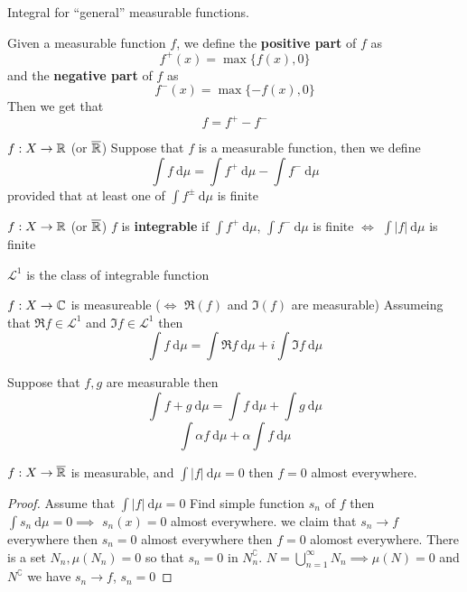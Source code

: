 Integral for ``general'' measurable functions.

\begin{definition}
  Given a measurable function $f$, we define the \textbf{positive part} of $f$ as 
  \[f^+(x) = \max\{f(x), 0\}\]
  and the \textbf{negative part} of $f$ as
  \[f^-(x) = \max\{-f(x), 0\}\]
  Then we get that 
  \[f = f^+ - f^-\]
\end{definition}

\begin{definition}
  $f: X \to \mathbb R$ (or $\overline{\mathbb R}$)
  Suppose that $f$ is a measurable function, then we define
  \[\int f \ \mathrm{d}\mu = \int f^+\ \mathrm{d}\mu - \int f^-\ \mathrm{d}\mu\]
  provided that at least one of $\int f^\pm \ \mathrm{d}\mu$ is finite
\end{definition}
\begin{definition}
  $f: X \to \mathbb R$ (or $\overline{\mathbb R}$)
  $f$ is \textbf{integrable} if $\int f^+ \ \mathrm{d}\mu$, $\int f^- \ \mathrm{d}\mu$ is finite
  $\iff$ $\int |f| \ \mathrm{d}\mu$ is finite

  $\mathcal{L}^1$ is the class of integrable function
\end{definition}

\begin{definition}
$f: X \to \mathbb C$ is measureable ($\iff$ $\Re(f)$ and $\Im(f)$ are measurable)
Assumeing that $\Re f \in \mathcal{L}^1$ and $\Im f \in \mathcal{L}^1$ then
\[\int f\ \mathrm{d}\mu = \int \Re f \ \mathrm{d}\mu + i \int \Im f \ \mathrm{d}\mu\]
\end{definition}

\begin{claim}
  Suppose that $f, g$ are measurable then
  \[\int f + g\ \mathrm{d}\mu  = \int f\ \mathrm{d}\mu + \int g\ \mathrm{d}\mu\]
  \[\int \alpha f \ \mathrm{d}\mu + \alpha \int f \ \mathrm{d}\mu\]
\end{claim}

\begin{lemma}
  $f: X \to \overline{\mathbb R}$ is measurable, and $\int |f| \ \mathrm{d}\mu = 0$ then $f = 0$ almost everywhere.
\end{lemma}

\begin{proof}
  Assume that $\int |f| \ \mathrm{d}\mu = 0$ Find simple function $s_n$ of $f$ then 
  $\int s_n \ \mathrm{d}\mu = 0 \implies$ $s_n(x) = 0$ almost everywhere.
  we claim that $s_n\to f$ everywhere then $s_n = 0$ almost everywhere then $f = 0$ alomost everywhere.
  There is a set $N_n, \mu(N_n) = 0$ so that $s_n = 0$ in $N_n^\complement$. 
  $N = \bigcup_{n=1}^\infty N_n \implies \mu(N) = 0$ and $N^\complement$ we have $s_n \to f$, $s_n = 0$
\end{proof}


